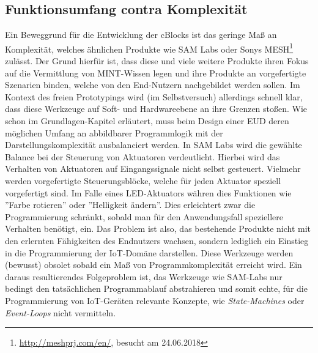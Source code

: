 \subsection{Funktionsumfang contra Komplexität}
Ein Beweggrund für die Entwicklung der cBlocks ist das geringe Maß an Komplexität, welches ähnlichen Produkte wie SAM Labs oder Sonys MESH\footnote{\url{http://meshprj.com/en/}, besucht am 24.06.2018} zulässt. Der Grund hierfür ist, dass diese und viele weitere Produkte ihren Fokus auf die Vermittlung von MINT-Wissen legen und ihre Produkte an vorgefertigte Szenarien binden, welche von den End-Nutzern nachgebildet werden sollen. Im Kontext des freien Prototypings wird (im Selbstversuch) allerdings schnell klar, dass diese Werkzeuge auf Soft- und Hardwareebene an ihre Grenzen stoßen. Wie schon im Grundlagen-Kapitel erläutert, muss beim Design einer \ac{EUD} deren möglichen Umfang an abbildbarer Programmlogik mit der Darstellungskomplexität ausbalanciert werden. In SAM Labs wird die gewählte Balance bei der Steuerung von Aktuatoren verdeutlicht. Hierbei wird das Verhalten von Aktuatoren auf Eingangssignale nicht selbst gesteuert. Vielmehr werden vorgefertigte Steuerungsblöcke, welche für jeden Aktuator speziell vorgefertigt sind. Im Falle eines LED-Aktuators währen dies Funktionen wie ''Farbe rotieren'' oder ''Helligkeit ändern''. Dies erleichtert zwar die Programmierung schränkt, sobald man für den Anwendungsfall speziellere Verhalten benötigt, ein. Das Problem ist also, das bestehende Produkte nicht mit den erlernten Fähigkeiten des Endnutzers wachsen, sondern lediglich ein Einstieg in die Programmierung der \ac{IoT}-Domäne darstellen. Diese Werkzeuge werden (bewusst) obsolet sobald ein Maß von Programmkomplexität erreicht wird. Ein daraus resultierendes Folgeproblem ist, das Werkzeuge wie SAM-Labs nur bedingt den tatsächlichen Programmablauf abstrahieren und somit echte, für die Programmierung von \ac{IoT}-Geräten relevante Konzepte, wie \textit{State-Machines} oder \textit{Event-Loops} nicht vermitteln.

